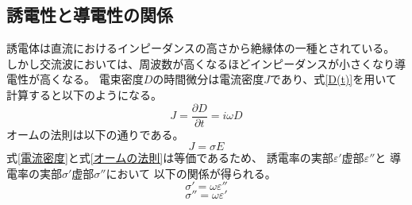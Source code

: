 \documentclass[dvipdfmx,12pt,a4paper]{jreport}
\begin{document}
			\subsection{誘電性と導電性の関係}
			誘電体は直流におけるインピーダンスの高さから絶縁体の一種とされている。
			しかし交流波においては、周波数が高くなるほどインピーダンスが小さくなり導電性が高くなる。
			電束密度$D$の時間微分は電流密度$J$であり、式\eqref{D(t)}を用いて計算すると以下のようになる。
			\begin{equation}
				J=\frac{\partial D}{\partial t}=i\omega D
				\label{電流密度}
			\end{equation}
			オームの法則は以下の通りである。
			\begin{equation}
				J=\sigma E
				\label{オームの法則}
			\end{equation}
			式\eqref{電流密度}と式\eqref{オームの法則}は等価であるため、
			誘電率の実部$\varepsilon'$虚部$\varepsilon''$と
			導電率の実部$\sigma'$虚部$\sigma''$において
			以下の関係が得られる。
			\begin{equation}
				\sigma'=\omega\varepsilon''
			\end{equation}
			\begin{equation}
				\sigma''=\omega\varepsilon'
			\end{equation}
\end{document}
